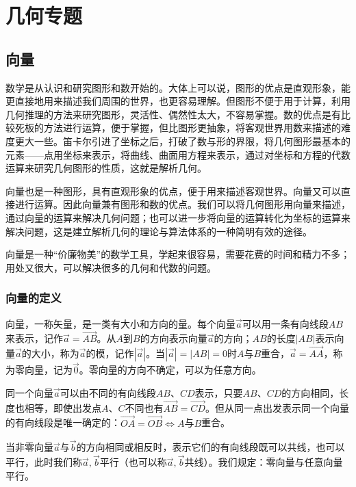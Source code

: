 \chapter{几何专题}

\section{向量}
数学是从认识和研究图形和数开始的。大体上可以说，图形的优点是直观形象，能更直接地用来描述我们周围的世界，也更容易理解。但图形不便于用于计算，利用几何推理的方法来研究图形，灵活性、偶然性太大，不容易掌握。数的优点是有比较死板的方法进行运算，便于掌握，但比图形更抽象，将客观世界用数来描述的难度更大一些。笛卡尔引进了坐标之后，打破了数与形的界限，将几何图形最基本的元素——点用坐标来表示，将曲线、曲面用方程来表示，通过对坐标和方程的代数运算来研究几何图形的性质，这就是解析几何。

向量也是一种图形，具有直观形象的优点，便于用来描述客观世界。向量又可以直接进行运算。因此向量兼有图形和数的优点。我们可以将几何图形用向量来描述，通过向量的运算来解决几何问题；也可以进一步将向量的运算转化为坐标的运算来解决问题，这是建立解析几何的理论与算法体系的一种简明有效的途径。

向量是一种“价廉物美”的数学工具，学起来很容易，需要花费的时间和精力不多；用处又很大，可以解决很多的几何和代数的问题。

\subsection{向量的定义}
向量，一称矢量，是一类有大小和方向的量。每个向量\(\vec{a}\)可以用一条有向线段\(A B\)来表示，记作\(\vec{a} = \vec{A B}\)。从\(A\)到\(B\)的方向表示向量\(\vec{a}\)的方向；\(A B\)的长度\(\left| A B \right|\)表示向量\(\vec{a}\)的大小，称为\(\vec{a}\)的模，记作\(\left| \vec{a} \right|\)。当\(\left| \vec{a} \right| = \left| A B \right| = 0\)时\(A\)与\(B\)重合，\(\vec{a} = \vec{A A}\)，称为零向量，记为\(\vec{0}\)。零向量的方向不确定，可以为任意方向。

同一个向量\(\vec{a}\)可以由不同的有向线段\(A B\)、\(C D\)表示，只要\(A B\)、\(C D\)的方向相同，长度也相等，即使出发点\(A\)、\(C\)不同也有\(\vec{A B} = \vec{C D}\)。但从同一点出发表示同一个向量的有向线段是唯一确定的：\(\vec{O A} = \vec{O B} \Longleftrightarrow A\)与\(B\)重合。

当非零向量\(\vec{a}\)与\(\vec{b}\)的方向相同或相反时，表示它们的有向线段既可以共线，也可以平行，此时我们称\(\vec{a} , \vec{b}\)平行（也可以称\(\vec{a} , \vec{b}\)共线）。我们规定：零向量与任意向量平行。

